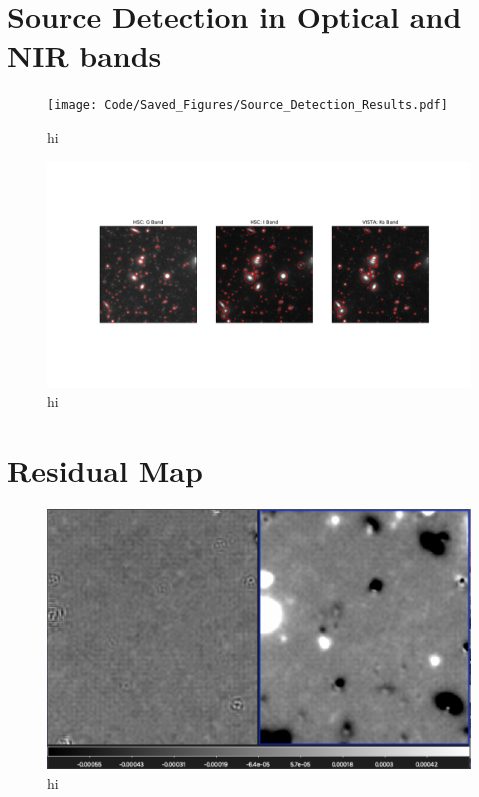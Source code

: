 \section{Source Detection in Optical and NIR bands}

\begin{figure}[h!]
    \centering
    \texttt{[image: Code/Saved\_Figures/Source\_Detection\_Results.pdf]}
    \caption{hi}
    \label{Source_detection}
\end{figure}

\begin{figure}[h!]
    \centering
    \includegraphics[trim={5cm 3cm 5cm 3cm},clip,width=\textwidth]{Code/Saved_Figures/Source_Detection_Zoom.pdf}
    \caption{hi}
    \label{Source_detection_Zoom}
\end{figure}

\newpage
\section{Residual Map}

\begin{figure}[h!]
    \centering
    \includegraphics[scale=0.5]{Code/Saved_Figures/comparing_residual_maps}
    \caption{hi}
    \label{Comparing_residual_maps}
\end{figure}

